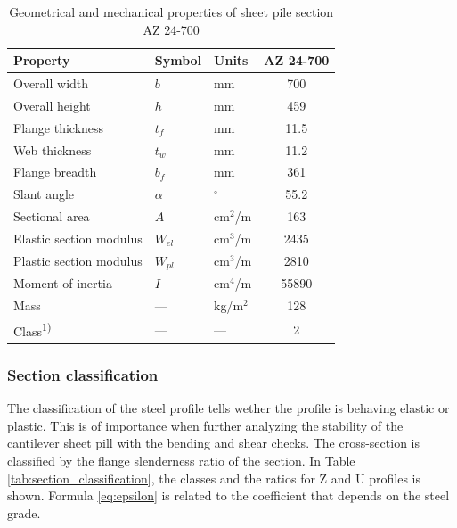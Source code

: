 
\begin{table}[H]
  \centering
  \small
  \setlength{\tabcolsep}{6pt}
  \renewcommand{\arraystretch}{1.15}
  \caption{Geometrical and mechanical properties of sheet pile section AZ 24-700}
  \label{tab:pu32}
  \begin{tabular}{@{}l l l c@{}}
    \toprule
    Property & Symbol & Units & AZ 24-700 \\
    \midrule
    Overall width                & $b$     & mm     & 700   \\
    Overall height               & $h$     & mm     & 459   \\
    Flange thickness             & $t_f$   & mm     & 11.5  \\
    Web thickness                & $t_w$   & mm     & 11.2  \\
    Flange breadth               & $b_f$   & mm     & 361   \\
    Slant angle                  & $\alpha$ & $^\circ$ & 55.2 \\
    Sectional area               & $A$     & cm$^2$/m & 163 \\
    Elastic section modulus      & $W_{el}$ & cm$^3$/m & 2435 \\
    Plastic section modulus      & $W_{pl}$ & cm$^3$/m & 2810 \\
    Moment of inertia            & $I$     & cm$^4$/m & 55890 \\
    Mass                         & ---     & kg/m$^2$ & 128 \\
    Class\textsuperscript{1)}    & ---     & ---     & 2 \\
    \bottomrule
  \end{tabular}
\end{table}


\subsubsection{Section classification}

The classification of the steel profile tells wether the profile is behaving elastic or plastic. This is of importance when further analyzing the stability of the cantilever sheet pill with the bending and shear checks. The cross-section is classified by the flange slenderness ratio of the section. In Table \ref{tab:section_classification}, the classes and the ratios for Z and U profiles is shown. Formula \ref{eq:epsilon} is related to the coefficient that depends on the steel grade. 

